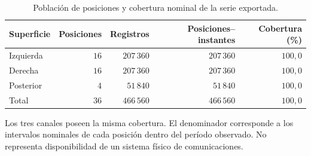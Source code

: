 \begin{table}[htbp]
\centering
\caption{Población de posiciones y cobertura nominal de la serie exportada.}
\label{tab:res_cobertura}
\small
\setlength{\tabcolsep}{5pt}
\begin{tabular}{lrrrr}
\toprule
Superficie & Posiciones & Registros & Posiciones--instantes & Cobertura (\%) \\
\midrule
Izquierda & $16$ & $207\,360$ & $207\,360$ & $100{,}0$ \\
Derecha & $16$ & $207\,360$ & $207\,360$ & $100{,}0$ \\
Posterior & $4$ & $51\,840$ & $51\,840$ & $100{,}0$ \\
Total & $36$ & $466\,560$ & $466\,560$ & $100{,}0$ \\
\bottomrule
\end{tabular}
\par\vspace{3pt}
\begin{minipage}{0.98\textwidth}\footnotesize
Los tres canales poseen la misma cobertura. El denominador corresponde a los intervalos nominales de cada posición dentro del período observado. No representa disponibilidad de un sistema físico de comunicaciones.
\end{minipage}
\end{table}
